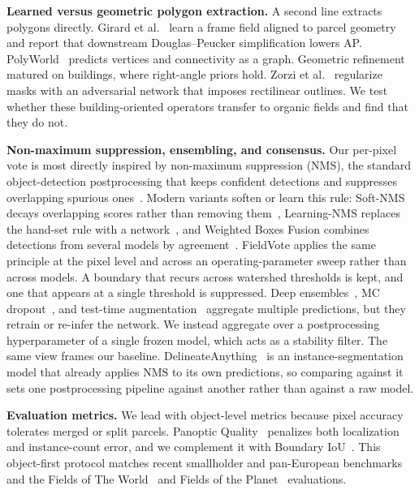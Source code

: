 \documentclass[conference]{IEEEtran}
\newcommand{\parhead}[1]{\smallskip\noindent\textbf{#1}\hspace{0.6em}}
\begin{document}
\parhead{Learned versus geometric polygon extraction.}
A second line extracts polygons directly. Girard et al.~\cite{girard2021framefield} learn a frame field aligned to parcel geometry and report that downstream Douglas--Peucker simplification lowers AP. PolyWorld~\cite{zorzi2022polyworld} predicts vertices and connectivity as a graph. Geometric refinement matured on buildings, where right-angle priors hold. Zorzi et al.~\cite{zorzi2020regularization} regularize masks with an adversarial network that imposes rectilinear outlines. We test whether these building-oriented operators transfer to organic fields and find that they do not.

\parhead{Non-maximum suppression, ensembling, and consensus.}
Our per-pixel vote is most directly inspired by non-maximum suppression (NMS), the standard object-detection postprocessing that keeps confident detections and suppresses overlapping spurious ones~\cite{neubeck2006nms}. Modern variants soften or learn this rule: Soft-NMS decays overlapping scores rather than removing them~\cite{bodla2017softnms}, Learning-NMS replaces the hand-set rule with a network~\cite{hosang2017learningnms}, and Weighted Boxes Fusion combines detections from several models by agreement~\cite{solovyev2021wbf}. FieldVote applies the same principle at the pixel level and across an operating-parameter sweep rather than across models. A boundary that recurs across watershed thresholds is kept, and one that appears at a single threshold is suppressed. Deep ensembles~\cite{lakshminarayanan2017deepensembles}, MC dropout~\cite{gal2016dropout}, and test-time augmentation~\cite{wang2019tta} aggregate multiple predictions, but they retrain or re-infer the network. We instead aggregate over a postprocessing hyperparameter of a single frozen model, which acts as a stability filter. The same view frames our baseline. DelineateAnything~\cite{lavreniuk2025delineateanything} is an instance-segmentation model that already applies NMS to its own predictions, so comparing against it sets one postprocessing pipeline against another rather than against a raw model.

\parhead{Evaluation metrics.}
We lead with object-level metrics because pixel accuracy tolerates merged or split parcels. Panoptic Quality~\cite{kirillov2019panoptic} penalizes both localization and instance-count error, and we complement it with Boundary IoU~\cite{cheng2021boundaryiou}. This object-first protocol matches recent smallholder and pan-European benchmarks~\cite{persello2023ai4smallfarms,dandrimont2023ai4boundaries} and the Fields of The World~\cite{kerner2024ftw} and Fields of the Planet~\cite{corley_ftp} evaluations.
\end{document}
